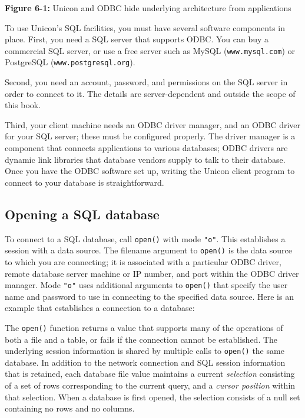 {\sffamily\bfseries Figure 6-1:}
{\sffamily Unicon and ODBC hide underlying architecture from
 applications}

\bigskip

To use Unicon's SQL facilities, you must have several
software components in place. First, you need a SQL server that
supports ODBC. You can buy a commercial SQL server, or
use a free server such as MySQL
(\texttt{www.mysql.com}) or PostgreSQL
(\texttt{www.postgresql.org}).

Second, you need an account, password, and permissions on the SQL
server in order to connect to it. The details are
server-dependent and outside the scope of this book.

Third, your client machine needs an ODBC
driver manager, and an ODBC driver for your SQL server; these must
be configured properly. The driver manager is a component
that connects applications to various databases; ODBC
drivers are dynamic link libraries that database vendors supply
to talk to their database. Once you have the ODBC software set up,
writing the Unicon client program to connect to your database is
straightforward.

\subsection{Opening a SQL database}

To connect to a SQL database, call \texttt{open()}
with mode \texttt{"o"}. This establishes a
session with a data source. The filename argument to \texttt{open()} is
the data source to which you are connecting; it is associated with a
particular ODBC driver, remote database server machine or IP number,
and port within the ODBC driver manager. Mode
\texttt{"o"} uses additional arguments to
\texttt{open()} that specify the user name and password to use in
connecting to the specified data source. Here is an example that
establishes a connection to a database:


The \texttt{open()} function returns a value that supports many of the
operations of both a file and a table, or fails if the connection
cannot be established. The underlying session information is shared by
multiple calls to \texttt{open()} the same database. In addition to
the network connection and SQL session information that is retained,
each database file value maintains a current \textit{selection}
consisting of a set of rows corresponding to the current query, and a
\textit{cursor position} within that selection. When a database is
first opened, the selection consists of a null set containing no rows
and no columns.

